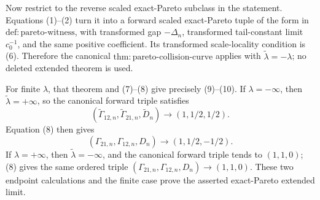 Now restrict to the reverse scaled exact-Pareto subclass in the statement.  Equations (1)--(2) turn it into a forward scaled exact-Pareto tuple of the form in \(\mathrm{def{:}pareto\text{-}witness}\), with transformed gap \(-\Delta_n\), transformed tail-constant limit \(c_0^{-1}\), and the same positive coefficient.  Its transformed scale-locality condition is (6).  Therefore the canonical \(\mathrm{thm{:}pareto\text{-}collision\text{-}curve}\) applies with \(\widetilde\lambda=-\lambda\); no deleted extended theorem is used.

For finite \(\lambda\), that theorem and (7)--(8) give precisely (9)--(10).  If \(\lambda=-\infty\), then \(\widetilde\lambda=+\infty\), so the canonical forward triple satisfies
\[
(\widetilde\Gamma_{12,n},\widetilde\Gamma_{21,n},\widetilde D_n)
\longrightarrow(1,1/2,1/2).
\]
Equation (8) then gives
\[
(\Gamma_{21,n},\Gamma_{12,n},D_n)\longrightarrow(1,1/2,-1/2).
\]
If \(\lambda=+\infty\), then \(\widetilde\lambda=-\infty\), and the canonical forward triple tends to \((1,1,0)\); (8) gives the same ordered triple \((\Gamma_{21,n},\Gamma_{12,n},D_n)\to(1,1,0)\).  These two endpoint calculations and the finite case prove the asserted exact-Pareto extended limit.